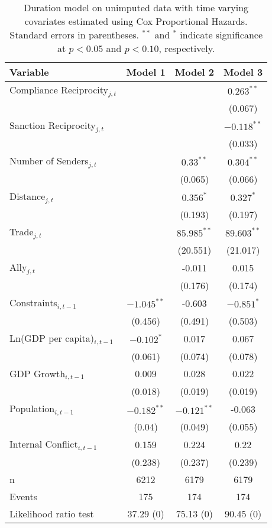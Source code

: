 \begin{table}[ht]
\centering
{\normalsize
\begin{tabular}{lccc}
 Variable & Model 1 & Model 2 & Model 3 \\ 
  \hline
\hline
Compliance Reciprocity$_{j,t}$ &  &  & $0.263^{\ast\ast}$ \\ 
   &  &  & (0.067) \\ 
  Sanction Reciprocity$_{j,t}$ &  &  & $-0.118^{\ast\ast}$ \\ 
   &  &  & (0.033) \\ 
   \hline
Number of Senders$_{j,t}$ &  & $0.33^{\ast\ast}$ & $0.304^{\ast\ast}$ \\ 
   &  & (0.065) & (0.066) \\ 
  Distance$_{j,t}$ &  & $0.356^{\ast}$ & $0.327^{\ast}$ \\ 
   &  & (0.193) & (0.197) \\ 
  Trade$_{j,t}$ &  & $85.985^{\ast\ast}$ & $89.603^{\ast\ast}$ \\ 
   &  & (20.551) & (21.017) \\ 
  Ally$_{j,t}$ &  & -0.011 & 0.015 \\ 
   &  & (0.176) & (0.174) \\ 
   \hline
Constraints$_{i,t-1}$ & $-1.045^{\ast\ast}$ & -0.603 & $-0.851^{\ast}$ \\ 
   & (0.456) & (0.491) & (0.503) \\ 
  Ln(GDP per capita)$_{i,t-1}$ & $-0.102^{\ast}$ & 0.017 & 0.067 \\ 
   & (0.061) & (0.074) & (0.078) \\ 
  GDP Growth$_{i,t-1}$ & 0.009 & 0.028 & 0.022 \\ 
   & (0.018) & (0.019) & (0.019) \\ 
  Population$_{i,t-1}$ & $-0.182^{\ast\ast}$ & $-0.121^{\ast\ast}$ & -0.063 \\ 
   & (0.04) & (0.049) & (0.055) \\ 
  Internal Conflict$_{i,t-1}$ & 0.159 & 0.224 & 0.22 \\ 
   & (0.238) & (0.237) & (0.239) \\ 
   \hline
n & 6212 & 6179 & 6179 \\ 
  Events & 175 & 174 & 174 \\ 
  Likelihood ratio test & 37.29 (0) & 75.13 (0) & 90.45 (0) \\ 
   \hline
\hline
\end{tabular}
}
\caption{Duration model on unimputed data with time varying covariates estimated using Cox Proportional Hazards. Standard errors in parentheses. $^{**}$ and $^{*}$ indicate significance at $p< 0.05 $ and $p< 0.10 $, respectively.} 
\label{tab:regResultsNoImp}
\end{table}

